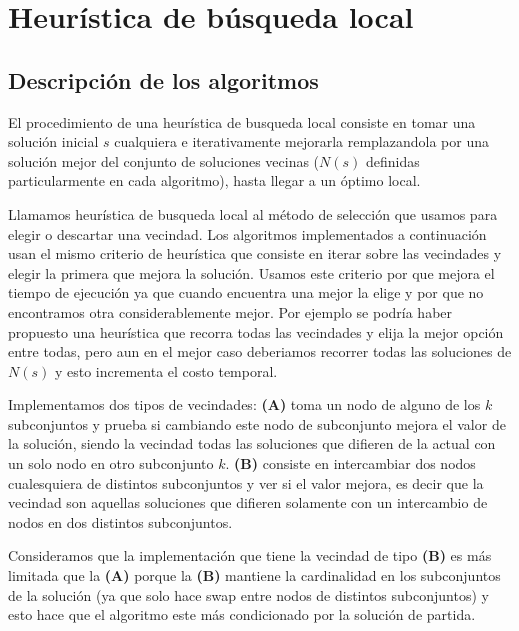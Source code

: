 \section{Heurística de búsqueda local}
\subsection{Descripción de los algoritmos}
El procedimiento de una heurística de busqueda local consiste en tomar una solución inicial $s$ cualquiera e iterativamente mejorarla remplazandola por una solución mejor del conjunto de soluciones vecinas ($N(s)$ definidas particularmente en cada algoritmo), hasta llegar a un óptimo local.

Llamamos heurística de busqueda local al método de selección que usamos para elegir o descartar una vecindad. Los algoritmos implementados a continuación usan el mismo criterio de heurística que consiste en iterar sobre las vecindades y elegir la primera que mejora la solución. Usamos este criterio por que mejora el tiempo de ejecución ya que cuando encuentra una mejor la elige y por que no encontramos otra considerablemente mejor. Por ejemplo se podría haber propuesto una heurística que recorra todas las vecindades y elija la mejor opción entre todas, pero aun en el mejor caso deberiamos recorrer todas las soluciones de $N(s)$ y esto incrementa el costo temporal.

Implementamos dos tipos de vecindades: \textbf{(A)} toma un nodo de alguno de los $k$ subconjuntos y prueba si cambiando este nodo de subconjunto mejora el valor de la solución, siendo la vecindad todas las soluciones que difieren de la actual con un solo nodo en otro subconjunto $k$. \textbf{(B)} consiste en intercambiar dos nodos cualesquiera de distintos subconjuntos y ver si el valor mejora, es decir que la vecindad son aquellas soluciones que difieren solamente con un intercambio de nodos en dos distintos subconjuntos.

Consideramos que la implementación que tiene la vecindad de tipo \textbf{(B)} es más limitada que la \textbf{(A)} porque la \textbf{(B)} mantiene la cardinalidad en los subconjuntos de la solución (ya que solo hace swap entre nodos de distintos subconjuntos) y esto hace que el algoritmo este más condicionado por la solución de partida.

